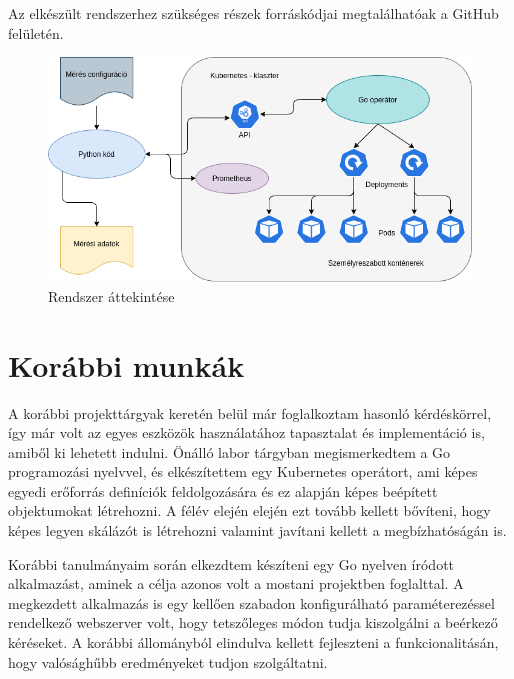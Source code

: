 Az elkészült rendszerhez szükséges részek forráskódjai megtalálhatóak a GitHub felületén\citep{gitRepo}. 

\begin{figure}[!ht]
\centering
\includegraphics[width=150mm, keepaspectratio]{figures/system_overview.png}
\caption{Rendszer áttekintése}
\label{fig:system_overview}
\end{figure}

\section{Korábbi munkák}
A korábbi projekttárgyak keretén belül már foglalkoztam hasonló kérdéskörrel, így már volt az egyes eszközök használatához tapasztalat és implementáció is, amiből ki lehetett indulni. 
Önálló labor tárgyban megismerkedtem a Go programozási nyelvvel, és elkészítettem egy Kubernetes operátort, ami képes egyedi erőforrás definíciók feldolgozására és ez alapján képes beépített objektumokat létrehozni. A félév elején elején ezt tovább kellett bővíteni, hogy képes legyen skálázót is létrehozni valamint javítani kellett a megbízhatóságán is.

Korábbi tanulmányaim során elkezdtem készíteni egy Go nyelven íródott alkalmazást, aminek a célja azonos volt a mostani projektben foglalttal.
A megkezdett alkalmazás is egy kellően szabadon konfigurálható paraméterezéssel rendelkező webszerver volt, hogy tetszőleges módon tudja kiszolgálni a beérkező kéréseket. 
A korábbi állományból elindulva kellett fejleszteni a funkcionalitásán, hogy valósághűbb eredményeket tudjon szolgáltatni.

